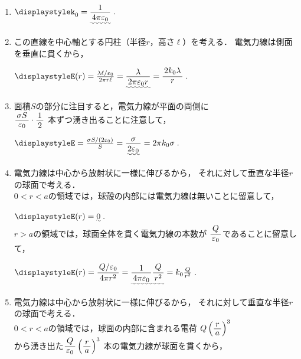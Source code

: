 ﻿\documentclass[../../../ps_a.tex]{subfiles}
\begin{document}
    \begin{enumerate}
        \item%
            \myspaceb%
            $\displaystyle%
                k_0 = \uwave{\myfraca{1}{4\pi \varepsilon_0}} \;.
            $            
        \item%
            この直線を中心軸とする円柱（半径$r$，高さ$\ell$）を考える．%
            電気力線は側面を垂直に貫くから，
            
            \myspaceb%
            $\displaystyle%
                E(r) = \frac{\lambda \ell / \varepsilon_0}{2\pi r \ell}%
                = \uwave{\myfraca{\lambda}{2\pi \varepsilon_0 r}}%
                = \myfracd{2k_0 \lambda}{r} \;.
            $
        \item%
            面積$S$の部分に注目すると，電気力線が平面の両側に\\
            $\myfracb{\sigma S}{\varepsilon_0} \cdot \myfraca{1}{2}$
            本ずつ湧き出ることに注意して，
            
            \myspaceb%
            $\displaystyle%
                E = \frac{\sigma S/(2\varepsilon_0)}{S} %
                = \uwave{\myfraca{\sigma}{2\varepsilon_0}}%
                = 2\pi k_0 \sigma \;.
            $
        \item%
            電気力線は中心から放射状に一様に伸びるから，%
            それに対して垂直な半径$r$の球面で考える．\\
            \uline{$0<r<a$}の領域では，球殻の内部には電気力線は無いことに留意して，
            
            \myspaceb%
            $\displaystyle%
                E(r) = \uwave{0} \;.
            $\\
            \uline{$r>a$}の領域では，球面全体を貫く電気力線の本数が%
            $\myfracd{Q}{\varepsilon_0}$であることに留意して，
            
            \myspaceb%
            $\displaystyle%
                E(r) = \myfracc{Q/\varepsilon_0}{4\pi r^2}%
                = \uwave{\myfraca{1}{4\pi \varepsilon_0} \myfracc{Q}{r^2}}%
                = k_0 \frac{Q}{r^2} \;.
            $            
        \item%
            電気力線は中心から放射状に一様に伸びるから，%
            それに対して垂直な半径$r$の球面で考える．\\
            \uline{$0<r<a$}の領域では，球面の内部に含まれる電荷%
            $Q \left( \myfracb{r}{a} \right)^3$\\
            から湧き出た$\myfracd{Q}{\varepsilon_0} \left( \myfracb{r}{a} \right)^3$%
            本の電気力線が球面を貫くから，
            

\end{enumerate}
\end{document}
